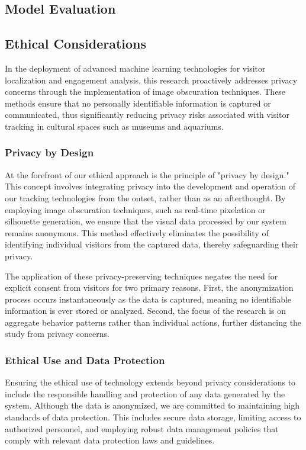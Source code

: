\subsection{Model Evaluation}


\subsection{Ethical Considerations}
In the deployment of advanced machine learning technologies for visitor localization and engagement analysis, this research proactively addresses privacy concerns through the implementation of image obscuration techniques. These methods ensure that no personally identifiable information is captured or communicated, thus significantly reducing privacy risks associated with visitor tracking in cultural spaces such as museums and aquariums.

\subsubsection{Privacy by Design}
At the forefront of our ethical approach is the principle of "privacy by design." This concept involves integrating privacy into the development and operation of our tracking technologies from the outset, rather than as an afterthought. By employing image obscuration techniques, such as real-time pixelation or silhouette generation, we ensure that the visual data processed by our system remains anonymous. This method effectively eliminates the possibility of identifying individual visitors from the captured data, thereby safeguarding their privacy.

The application of these privacy-preserving techniques negates the need for explicit consent from visitors for two primary reasons. First, the anonymization process occurs instantaneously as the data is captured, meaning no identifiable information is ever stored or analyzed. Second, the focus of the research is on aggregate behavior patterns rather than individual actions, further distancing the study from privacy concerns.

\subsubsection{Ethical Use and Data Protection}
Ensuring the ethical use of technology extends beyond privacy considerations to include the responsible handling and protection of any data generated by the system. Although the data is anonymized, we are committed to maintaining high standards of data protection. This includes secure data storage, limiting access to authorized personnel, and employing robust data management policies that comply with relevant data protection laws and guidelines.

